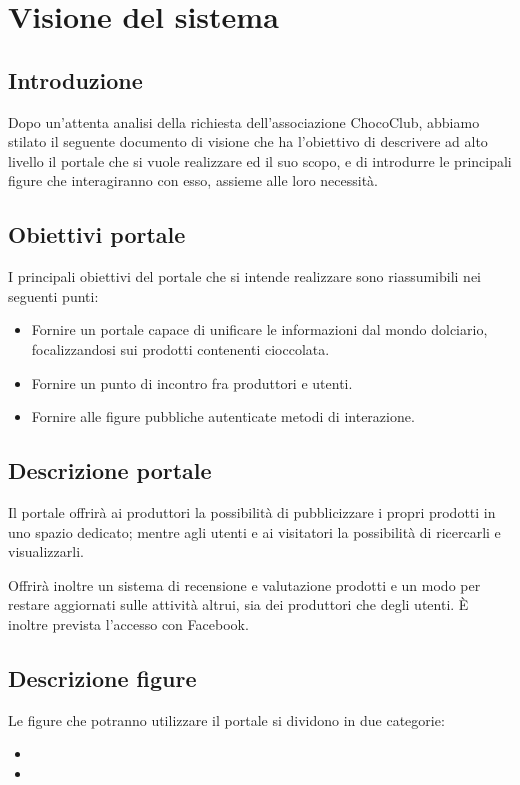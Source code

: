 \chapter{Visione del sistema} 
\label{cha:documento_di_visione}

\section{Introduzione}
Dopo un'attenta analisi della richiesta dell'associazione ChocoClub, abbiamo stilato il seguente documento di visione che ha l'obiettivo di descrivere ad alto livello il portale che si vuole realizzare ed il suo scopo, e di introdurre le principali figure che interagiranno con esso, assieme alle loro necessità.

\section{Obiettivi portale} 
\label{sec:obiettivi_portale}
I principali obiettivi del portale che si intende realizzare sono riassumibili nei seguenti punti:
\begin{itemize}
	\item Fornire un portale capace di unificare le informazioni dal mondo dolciario, focalizzandosi sui prodotti contenenti cioccolata.
	\item Fornire un punto di incontro fra produttori e utenti.
	\item Fornire alle figure pubbliche autenticate metodi di interazione.
\end{itemize}

\section{Descrizione portale}
\label{sec:descrizione_portale}
Il portale offrirà ai produttori la possibilità di pubblicizzare i propri prodotti in uno spazio dedicato; mentre agli utenti e ai visitatori la possibilità di ricercarli e visualizzarli. 

Offrirà inoltre un sistema di recensione e valutazione prodotti e un modo per restare aggiornati sulle attività altrui, sia dei produttori che degli utenti.
È inoltre prevista l'accesso con Facebook.
\section{Descrizione figure} 
\label{sec:descrizione_figure}
Le figure che potranno utilizzare il portale si dividono in due categorie:
\begin{itemize}
	\item {}
	\item {}
\end{itemize}

